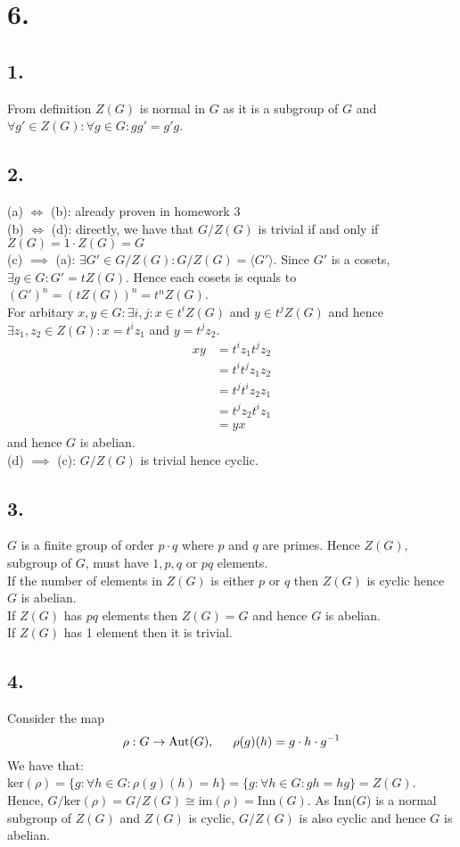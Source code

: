 \documentclass[11pt]{article}
\begin{document}
\section*{6.}	
\subsection*{1.}
From definition $Z(G)$ is normal in $G$ as it is a subgroup of $G$ and $\forall g' \in Z(G): \forall g \in G: gg' = g'g$.  
\subsection*{2.}
(a) $\iff$ (b): already proven in homework 3 \\
(b) $\iff$ (d): directly, we have that $G/Z(G)$ is trivial if and only if $Z(G) = 1 \cdot Z(G) = G$ \\
(c) $\implies$ (a): $\exists G' \in G/Z(G): G/Z(G) = \langle G' \rangle$. Since $G'$ is a cosets, $\exists g \in G: G' = tZ(G)$. Hence each cosets is equals to $(G')^n = (tZ(G))^n = t^n Z(G)$. \\
For arbitary $x,y \in G: \exists i,j: x \in t^iZ(G)$ and $y \in t^jZ(G)$ and hence $\exists z_1, z_2 \in Z(G):x = t^iz_1$ and $y = t^jz_2$. \\
\begin{equation*}
\begin{aligned}
xy &= t^iz_1 t^jz_2 \\
&= t^i t^j z_1 z_2 \\
&= t^j t^i z_2 z_1 \\
&= t^j z_2 t^i z_1 \\
&= yx
\end{aligned}
\end{equation*}
and hence $G$ is abelian. \\
(d) $\implies$ (c): $G/Z(G)$ is trivial hence cyclic.
\subsection*{3.}
$G$ is a finite group of order $p \cdot q$ where $p$ and $q$ are primes. Hence $Z(G)$, subgroup of $G$, must have $1,p,q$ or $pq$ elements. \\
If the number of elements in $Z(G)$ is either $p$ or $q$ then $Z(G)$ is cyclic hence $G$ is abelian. \\
If $Z(G)$ has $pq$ elements then $Z(G) = G$ and hence $G$ is abelian. \\
If $Z(G)$ has 1 element then it is trivial.
\subsection*{4.}
Consider the map 
\[
\rho: G \to \text{Aut}(G), \indent  \rho(g)(h) = g \cdot h \cdot g^{-1}
\]
We have that:\\
ker$(\rho) = \{g: \forall h \in G: \rho(g)(h) = h\} = \{g: \forall h \in G: gh = hg\} = Z(G)$.
Hence, $G/\text{ker}(\rho) = G/Z(G) \cong \text{im}(\rho) = \text{Inn}(G)$. As Inn($G$) is a normal subgroup of $Z(G)$ and $Z(G)$ is cyclic, $G/Z(G)$ is also cyclic and hence $G$ is abelian.
\end{document}
